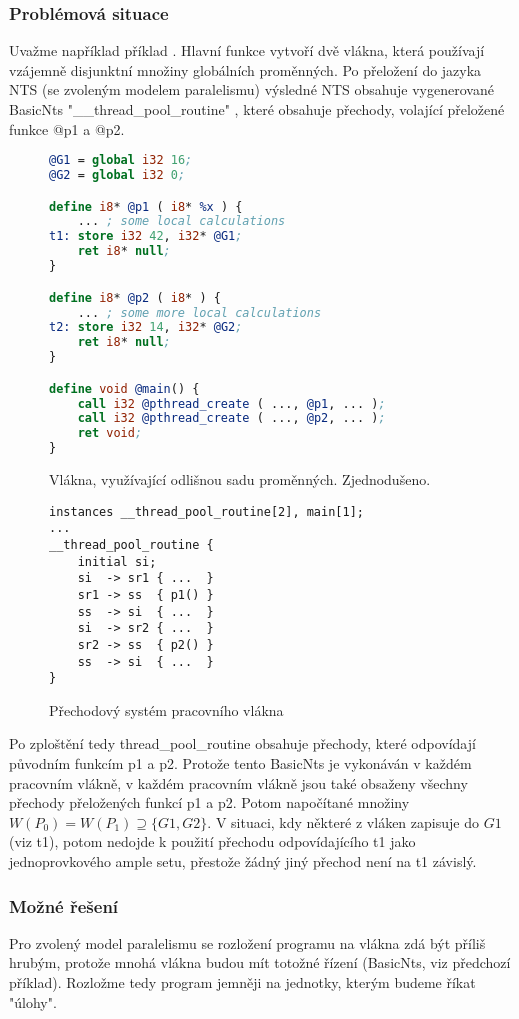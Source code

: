 \documentclass{fithesis2}
\begin{document}
\subsubsection{Problémová situace}
Uvažme například příklad . Hlavní funkce vytvoří dvě vlákna, která používají vzájemně disjunktní množiny globálních proměnných. Po přeložení do jazyka NTS (se zvoleným modelem paralelismu) výsledné NTS obsahuje vygenerované BasicNts "__thread_pool_routine" , které obsahuje přechody, volající přeložené funkce @p1 a @p2.
\begin{figure}[h!]
\begin{lstlisting}[language=llvm]
@G1 = global i32 16;
@G2 = global i32 0;

define i8* @p1 ( i8* %x ) {
	... ; some local calculations
t1:	store i32 42, i32* @G1;
	ret i8* null;
}

define i8* @p2 ( i8* ) {
	... ; some more local calculations
t2:	store i32 14, i32* @G2;
	ret i8* null;
}

define void @main() {
	call i32 @pthread_create ( ..., @p1, ... );
	call i32 @pthread_create ( ..., @p2, ... );
	ret void;
}
\end{lstlisting}
\caption{Vlákna, využívající odlišnou sadu proměnných. Zjednodušeno.}
\end{figure}

\begin{figure}
\begin{lstlisting}
instances __thread_pool_routine[2], main[1];
...
__thread_pool_routine {
	initial	si;
	si  -> sr1 { ...  }
	sr1 -> ss  { p1() }
	ss  -> si  { ...  }
	si  -> sr2 { ...  }
	sr2 -> ss  { p2() }
	ss  -> si  { ...  }
}
\end{lstlisting}
\caption{Přechodový systém pracovního vlákna}
\end{figure}

Po zploštění tedy thread\_pool\_routine obsahuje přechody, které odpovídají původním funkcím p1 a p2. Protože tento BasicNts je vykonáván v každém pracovním vlákně, v každém pracovním vlákně jsou také obsaženy všechny přechody přeložených funkcí p1 a p2. Potom napočítané množiny $W(P_0) = W(P_1) \supseteq \{ G1, G2\}$. V situaci, kdy některé z vláken zapisuje do $G1$ (viz t1), potom nedojde k použití přechodu odpovídajícího t1 jako jednoprovkového ample setu, přestože žádný jiný přechod není na t1 závislý. 

\subsubsection{Možné řešení}
Pro zvolený model paralelismu se rozložení programu na vlákna zdá být příliš hrubým, protože mnohá vlákna budou mít totožné řízení (BasicNts, viz předchozí příklad). Rozložme tedy program jemněji na jednotky, kterým budeme říkat "úlohy".
\end{document}

